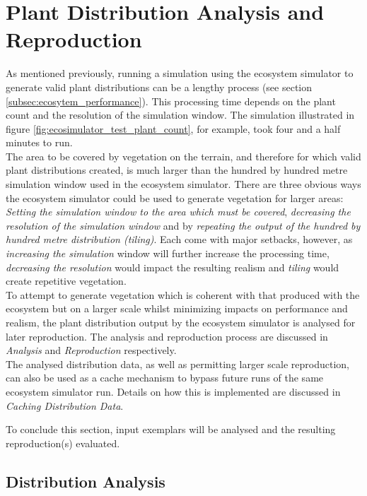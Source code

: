 \section{Plant Distribution Analysis and Reproduction} \label{sec:dist_analysis_and_rep}

As mentioned previously, running a simulation using the ecosystem simulator to generate valid plant distributions can be a lengthy process (see section \ref{subsec:ecosytem_performance}). This processing time depends on the plant count and the resolution of the simulation window. The simulation illustrated in figure \ref{fig:ecosimulator_test_plant_count}, for example, took four and a half minutes to run.\\

The area to be covered by vegetation on the terrain, and therefore for which valid plant distributions created, is much larger than the hundred by hundred metre simulation window used in the ecosystem simulator. There are three obvious ways the ecosystem simulator could be used to generate vegetation for larger areas: \textit{Setting the simulation window to the area which must be covered}, \textit{decreasing the resolution of the simulation window} and by \textit{repeating the output of the hundred by hundred metre distribution (tiling)}. Each come with major setbacks, however, as \textit{increasing the simulation} window will further increase the processing time, \textit{decreasing the resolution} would impact the resulting realism and \textit{tiling} would create repetitive vegetation.\\

To attempt to generate vegetation which is coherent with that produced with the ecosystem but on a larger scale whilst minimizing impacts on performance and realism, the plant distribution output by the ecosystem simulator is analysed for later reproduction. The analysis and reproduction process are discussed in \textit{Analysis} and \textit{Reproduction} respectively.\\

The analysed distribution data, as well as permitting larger scale reproduction, can also be used as a cache mechanism to bypass future runs of the same ecosystem simulator run. Details on how this is implemented are discussed in \textit{Caching Distribution Data}.

To conclude this section, input exemplars will be analysed and the resulting reproduction(s) evaluated.

\subsection{Distribution Analysis}

